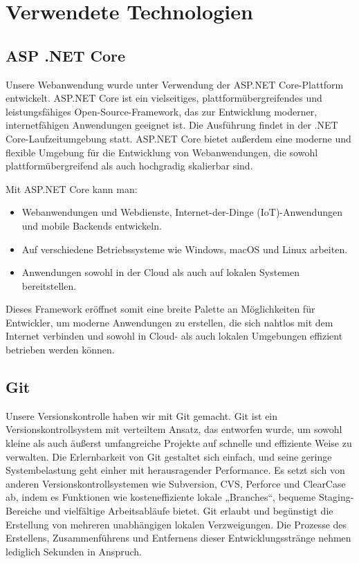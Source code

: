\section{Verwendete Technologien}

\subsection*{ASP .NET Core}

Unsere Webanwendung wurde unter Verwendung der ASP.NET Core-Plattform entwickelt. 
ASP.NET Core ist ein vielseitiges, plattformübergreifendes und leistungsfähiges 
Open-Source-Framework, das zur Entwicklung moderner, internetfähigen Anwendungen geeignet ist. 
Die Ausführung findet in der .NET Core-Laufzeitumgebung statt.
ASP.NET Core bietet außerdem eine moderne und flexible Umgebung für die Entwicklung von Webanwendungen, 
die sowohl plattformübergreifend als auch hochgradig skalierbar sind.

Mit ASP.NET Core kann man:

\begin{itemize}

\item Webanwendungen und Webdienste, Internet-der-Dinge (IoT)-Anwendungen und 
mobile Backends entwickeln.
\item Auf verschiedene Betriebssysteme wie Windows, macOS und Linux arbeiten.
\item Anwendungen sowohl in der Cloud als auch auf lokalen Systemen bereitstellen.
\end{itemize}

Dieses Framework eröffnet somit eine breite Palette an Möglichkeiten für Entwickler, 
um moderne Anwendungen zu erstellen, die sich nahtlos mit dem Internet verbinden und 
sowohl in Cloud- als auch lokalen Umgebungen effizient betrieben werden können.
\newpage

\subsection*{Git}

Unsere Versionskontrolle haben wir mit Git gemacht. Git ist ein Versionskontrollsystem 
mit verteiltem Ansatz, das entworfen wurde, um sowohl kleine als auch äußerst 
umfangreiche Projekte auf schnelle und effiziente Weise zu verwalten.
Die Erlernbarkeit von Git gestaltet sich einfach, und seine geringe Systembelastung 
geht einher mit herausragender Performance. Es setzt sich von anderen Versionskontrollsystemen 
wie Subversion, CVS, Perforce und ClearCase ab, indem es Funktionen wie kosteneffiziente 
lokale „Branches“, bequeme Staging-Bereiche und vielfältige Arbeitsabläufe bietet.
Git erlaubt und begünstigt die Erstellung von mehreren unabhängigen lokalen Verzweigungen. 
Die Prozesse des Erstellens, Zusammenführens und Entfernens dieser Entwicklungsstränge 
nehmen lediglich Sekunden in Anspruch. \\

